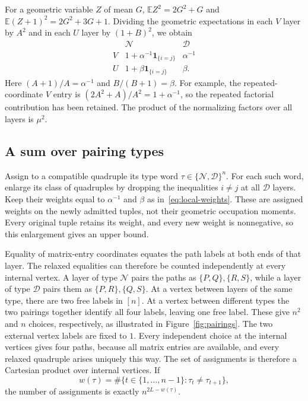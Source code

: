 For a geometric variable $Z$ of mean $G$,
$\mathbb EZ^2=2G^2+G$ and
$\mathbb E(Z+1)^2=2G^2+3G+1$.  Dividing the geometric expectations in
each $V$ layer by $A^2$ and in each $U$ layer by $(1+B)^2$, we obtain
\begin{equation}
\begin{array}{c|cc}
  &\mathcal N&\mathcal D\\ \hline
  V&1+\alpha^{-1}\mathbf1_{\{i=j\}}&\alpha^{-1}\\
  U&1+\beta\mathbf1_{\{i=j\}}&\beta.
\end{array}
  \label{eq:local-weights}
\end{equation}
Here $(A+1)/A=\alpha^{-1}$ and $B/(B+1)=\beta$.  For example,
the repeated-coordinate $V$ entry is
$(2A^2+A)/A^2=1+\alpha^{-1}$, so the repeated factorial contribution
has been retained.  The product of the normalizing factors over all
layers is $\mu^2$.

\subsection{A sum over pairing types}

Assign to a compatible quadruple its type word
$\tau\in\{\mathcal N,\mathcal D\}^n$.  For each such word, enlarge its
class of quadruples by dropping the inequalities $i\ne j$ at all
$\mathcal D$ layers.  Keep their weights equal to $\alpha^{-1}$ and
$\beta$ as in~\eqref{eq:local-weights}.  These are assigned weights on
the newly admitted tuples, not their geometric occupation moments.
Every original tuple retains its weight, and every new weight is
nonnegative, so this enlargement gives an upper bound.

Equality of matrix-entry coordinates equates the path labels at both
ends of that layer.  The relaxed equalities can therefore be counted
independently at every internal vertex.  A layer of type $\mathcal N$
pairs the paths as
$\{P,Q\},\{R,S\}$, while a layer of type $\mathcal D$ pairs them as
$\{P,R\},\{Q,S\}$.  At a vertex between layers of the same type, there
are two free labels in $[n]$.  At a vertex between different types the
two pairings together identify all four labels, leaving one free label.
These give $n^2$ and $n$ choices, respectively, as illustrated in
Figure~\ref{fig:pairings}.
The two external vertex labels are fixed to $1$.  Every independent
choice at the internal vertices gives four paths, because all matrix
entries are available, and every relaxed quadruple arises uniquely
this way.  The set of assignments is therefore a Cartesian product
over internal vertices.  If
\[
  w(\tau)=\#\{t\in\{1,\ldots,n-1\}:\tau_t\ne\tau_{t+1}\},
\]
the number of assignments is exactly $n^{2L-w(\tau)}$.

